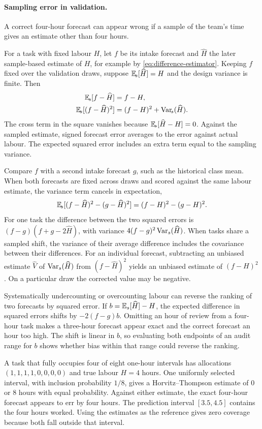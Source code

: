 \paragraph{Sampling error in validation.}
A correct four-hour forecast can appear wrong if a sample of the team's time gives an estimate other than four hours.

For a task with fixed labour $H$, let $f$ be its intake forecast and $\widehat H$ the later sample-based estimate of $H$, for example by \eqref{eq:difference-estimator}. Keeping $f$ fixed over the validation draws, suppose $\mathbb E_{\!s}[\widehat H]=H$ and the design variance is finite. Then
\begin{align*}
 \mathbb E_{\!s}[f-\widehat H]&=f-H,\\
 \mathbb E_{\!s}[(f-\widehat H)^2]&=(f-H)^2+\operatorname{Var}_{\!s}(\widehat H).
\end{align*}
The cross term in the square vanishes because $\mathbb E_{\!s}[\widehat H-H]=0$. Against the sampled estimate, signed forecast error averages to the error against actual labour. The expected squared error includes an extra term equal to the sampling variance.

Compare $f$ with a second intake forecast $g$, such as the historical class mean. When both forecasts are fixed across draws and scored against the same labour estimate, the variance term cancels in expectation,
\[
 \mathbb E_{\!s}[(f-\widehat H)^2-(g-\widehat H)^2]
 =(f-H)^2-(g-H)^2.
\]
For one task the difference between the two squared errors is $(f-g)(f+g-2\widehat H)$, with variance $4(f-g)^2\operatorname{Var}_s(\widehat H)$. When tasks share a sampled shift, the variance of their average difference includes the covariance between their differences. For an individual forecast, subtracting an unbiased estimate $\widehat V$ of $\operatorname{Var}_s(\widehat H)$ from $(f-\widehat H)^2$ yields an unbiased estimate of $(f-H)^2$. On a particular draw the corrected value may be negative.

Systematically undercounting or overcounting labour can reverse the ranking of two forecasts by squared error. If $b=\mathbb E_s[\widehat H]-H$, the expected difference in squared errors shifts by $-2(f-g)b$. Omitting an hour of review from a four-hour task makes a three-hour forecast appear exact and the correct forecast an hour too high. The shift is linear in $b$, so evaluating both endpoints of an audit range for $b$ shows whether bias within that range could reverse the ranking.

A task that fully occupies four of eight one-hour intervals has allocations $(1,1,1,1,0,0,0,0)$ and true labour $H=4$ hours. One uniformly selected interval, with inclusion probability $1/8$, gives a Horvitz--Thompson estimate of $0$ or $8$ hours with equal probability. Against either estimate, the exact four-hour forecast appears to err by four hours. The prediction interval $[3.5,4.5]$ contains the four hours worked. Using the estimates as the reference gives zero coverage because both fall outside that interval.

